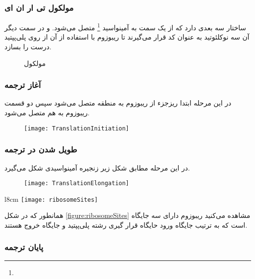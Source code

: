 \pagebreak
\subsubsection{مولکول تی ار ان ای}
ساختار سه بعدی دارد که از یک سمت به آمینواسید
\footnote{}
متصل می‌شود. و در سمت دیگر آن سه نوکلئوتید به عنوان کد قرار می‌گیرند تا ریبوزوم با استفاده از آن از روی
پلی‌پپتید درست را بسازد.

\begin{figure}[htbp]
	\qquad
		\caption{مولکول
		}
\end{figure}

\pagebreak
\subsubsection{آغاز ترجمه}
در این مرحله ابتدا ریزجزء
از ریبوزوم به منطقه
متصل می‌شود سپس دو قسمت ریبوزوم به هم متصل می‌شود.

\begin{figure}[htbp]
\centering
\texttt{[image: TranslationInitiation]}
\end{figure}

\pagebreak
\subsubsection{طویل شدن در ترجمه}
در این مرحله مطابق شکل زیر زنجیره آمینواسیدی شکل می‌گیرد.

\begin{figure}[htbp]
\centering
\texttt{[image: TranslationElongation]}
\end{figure}

\begin{wrapfigure}[3]{l}{8cm}
\centering
\texttt{[image: ribosomeSites]}
\caption{ریبوزوم}
\label{figure:ribosomeSites}
\end{wrapfigure}

همانطور که در شکل
\ref{figure:ribosomeSites}
مشاهده می‌کنید ریبوزوم دارای سه جایگاه است که به ترتیب جایگاه ورود
حایگاه قرار گیری رشته پلی‌پپتید و جایگاه خروج
هستند.

\pagebreak
\subsubsection{پایان ترجمه}

